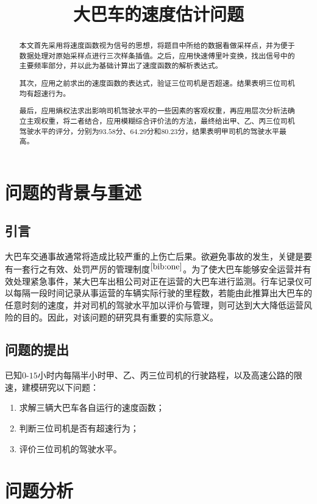 \documentclass[bwprint]{cumcmthesis}
\title{大巴车的速度估计问题}
\begin{document}
    \maketitle
    \begin{abstract}
    本文首先采用将速度函数视为信号的思想，将题目中所给的数据看做采样点，并为便于数据处理对原始采样点进行三次样条插值。之后，应用快速傅里叶变换，找出信号中的主要频率部分，并以此为基础计算出了速度函数的解析表达式。

    其次，应用之前求出的速度函数的表达式，验证三位司机是否超速。结果表明三位司机均有超速行为。
    
    最后，应用熵权法求出影响司机驾驶水平的一些因素的客观权重，再应用层次分析法确立主观权重，将二者结合，应用模糊综合评价法的方法，最终给出甲、乙、丙三位司机驾驶水平的评分，分别为$93.58$分、$64.29$分和$80.23$分，结果表明甲司机的驾驶水平最高。
    \end{abstract}
    \section{问题的背景与重述}
        \subsection{引言}
        大巴车交通事故通常将造成比较严重的上伤亡后果。欲避免事故的发生，关键是要有一套行之有效、处罚严厉的管理制度$^{\cite{bib:one}}$。为了使大巴车能够安全运营并有效处理紧急事件，某大巴车出租公司对正在运营的大巴车进行监测。行车记录仪可以每隔一段时间记录从事运营的车辆实际行驶的里程数，若能由此推算出大巴车的任意时刻的速度，并对司机的驾驶水平加以评价与管理，则可达到大大降低运营风险的目的。因此，对该问题的研究具有重要的实际意义。
        \subsection{问题的提出}
        已知$0$-$15$小时内每隔半小时甲、乙、丙三位司机的行驶路程，以及高速公路的限速，建模研究以下问题：
        \begin{enumerate}
            \item 求解三辆大巴车各自运行的速度函数；
            \item 判断三位司机是否有超速行为；
            \item 评价三位司机的驾驶水平。
        \end{enumerate}
    \section{问题分析}
\end{document}
